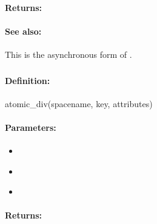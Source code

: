 \paragraph{Returns:}


\paragraph{See also:}  This is the asynchronous form of .

\pagebreak
\subsubsection{}
\label{api:ruby:atomic_div}


\paragraph{Definition:}
\begin{rubycode}
atomic_div(spacename, key, attributes)
\end{rubycode}

\paragraph{Parameters:}
\begin{itemize}[noitemsep]
\item {}\\

\item {}\\

\item {}\\

\end{itemize}

\paragraph{Returns:}


\pagebreak
\subsubsection{}
\label{api:ruby:async_atomic_div}


